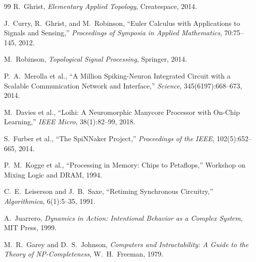 \documentclass[11pt, a4paper]{article}
\begin{document}
\begin{thebibliography}{99}
R.\ Ghrist, \textit{Elementary Applied Topology}, Createspace, 2014.

J.\ Curry, R.\ Ghrist, and M.\ Robinson, ``Euler Calculus with Applications to
Signals and Sensing,'' \textit{Proceedings of Symposia in Applied Mathematics},
70:75--145, 2012.

M.\ Robinson, \textit{Topological Signal Processing}, Springer, 2014.

P.\ A.\ Merolla et al., ``A Million Spiking-Neuron Integrated Circuit with a
Scalable Communication Network and Interface,''
\textit{Science}, 345(6197):668--673, 2014.

M.\ Davies et al., ``Loihi: A Neuromorphic Manycore Processor with On-Chip
Learning,'' \textit{IEEE Micro}, 38(1):82--99, 2018.

S.\ Furber et al., ``The SpiNNaker Project,''
\textit{Proceedings of the IEEE}, 102(5):652--665, 2014.

P.\ M.\ Kogge et al., ``Processing in Memory: Chips to Petaflops,''
Workshop on Mixing Logic and DRAM, 1994.

C.\ E.\ Leiserson and J.\ B.\ Saxe, ``Retiming Synchronous Circuitry,''
\textit{Algorithmica}, 6(1):5--35, 1991.

A.\ Juarrero, \textit{Dynamics in Action: Intentional Behavior as a Complex System},
MIT Press, 1999.

M.\ R.\ Garey and D.\ S.\ Johnson, \textit{Computers and Intractability: A Guide
to the Theory of NP-Completeness}, W.\ H.\ Freeman, 1979.

\end{thebibliography}
\end{document}
